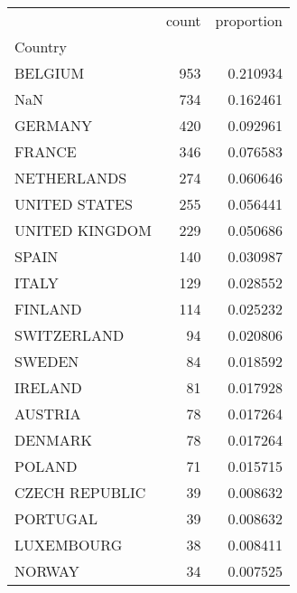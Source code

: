 \documentclass[ 11pt]{article}
\begin{document}
\begin{itemize}
\begin{tabular}{lrr}
\toprule
 & count & proportion \\
Country &  &  \\
\midrule
BELGIUM & 953 & 0.210934 \\
NaN & 734 & 0.162461 \\
GERMANY & 420 & 0.092961 \\
FRANCE & 346 & 0.076583 \\
NETHERLANDS & 274 & 0.060646 \\
UNITED STATES & 255 & 0.056441 \\
UNITED KINGDOM & 229 & 0.050686 \\
SPAIN & 140 & 0.030987 \\
ITALY & 129 & 0.028552 \\
FINLAND & 114 & 0.025232 \\
SWITZERLAND & 94 & 0.020806 \\
SWEDEN & 84 & 0.018592 \\
IRELAND & 81 & 0.017928 \\
AUSTRIA & 78 & 0.017264 \\
DENMARK & 78 & 0.017264 \\
POLAND & 71 & 0.015715 \\
CZECH REPUBLIC & 39 & 0.008632 \\
PORTUGAL & 39 & 0.008632 \\
LUXEMBOURG & 38 & 0.008411 \\
NORWAY & 34 & 0.007525 \\
\bottomrule
\end{tabular}



\end{itemize}





\newpage
\end{document}
